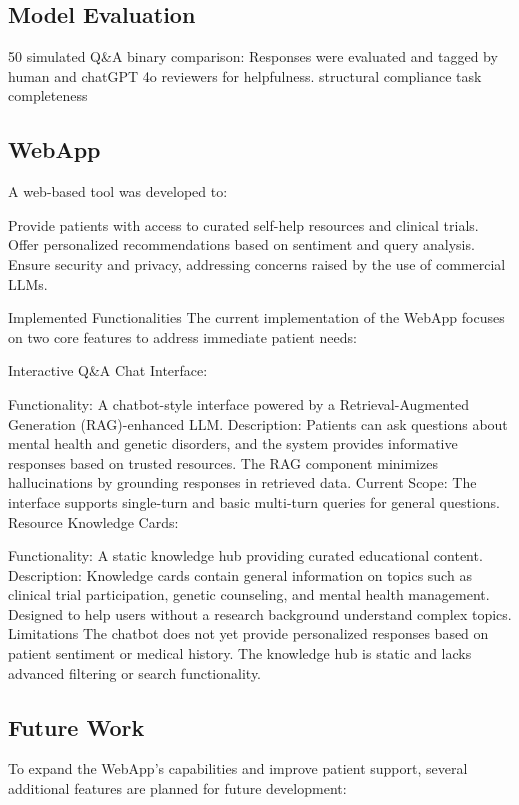 \documentclass{article} %
\begin{document}
\subsection{Model Evaluation}
50 simulated Q\&A binary comparison:
Responses were evaluated and tagged by human and chatGPT 4o reviewers for helpfulness.
structural compliance
task completeness

\subsection{WebApp}

A web-based tool was developed to:

Provide patients with access to curated self-help resources and clinical trials.
Offer personalized recommendations based on sentiment and query analysis.
Ensure security and privacy, addressing concerns raised by the use of commercial LLMs.

Implemented Functionalities
The current implementation of the WebApp focuses on two core features to address immediate patient needs:

Interactive Q&A Chat Interface:

Functionality: A chatbot-style interface powered by a Retrieval-Augmented Generation (RAG)-enhanced LLM.
Description:
Patients can ask questions about mental health and genetic disorders, and the system provides informative responses based on trusted resources.
The RAG component minimizes hallucinations by grounding responses in retrieved data.
Current Scope: The interface supports single-turn and basic multi-turn queries for general questions.
Resource Knowledge Cards:

Functionality: A static knowledge hub providing curated educational content.
Description:
Knowledge cards contain general information on topics such as clinical trial participation, genetic counseling, and mental health management.
Designed to help users without a research background understand complex topics.
Limitations
The chatbot does not yet provide personalized responses based on patient sentiment or medical history.
The knowledge hub is static and lacks advanced filtering or search functionality.

\subsection{Future Work}

To expand the WebApp's capabilities and improve patient support, several additional features are planned for future development:
\end{document}
